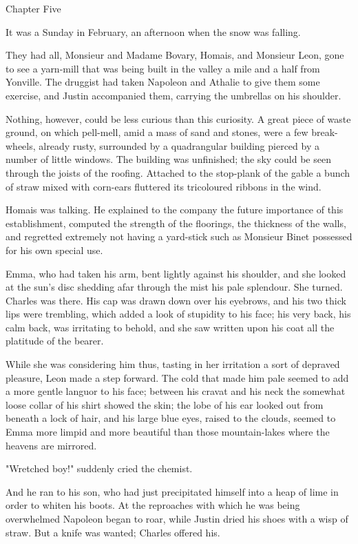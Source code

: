 \documentclass{tufte-book}
\begin{document}
Chapter Five

It was a Sunday in February, an afternoon when the snow was falling.

They had all, Monsieur and Madame Bovary, Homais, and Monsieur Leon,
gone to see a yarn-mill that was being built in the valley a mile and a
half from Yonville. The druggist had taken Napoleon and Athalie to give
them some exercise, and Justin accompanied them, carrying the umbrellas
on his shoulder.

Nothing, however, could be less curious than this curiosity. A great
piece of waste ground, on which pell-mell, amid a mass of sand and
stones, were a few break-wheels, already rusty, surrounded by a
quadrangular building pierced by a number of little windows. The
building was unfinished; the sky could be seen through the joists of the
roofing. Attached to the stop-plank of the gable a bunch of straw mixed
with corn-ears fluttered its tricoloured ribbons in the wind.

Homais was talking. He explained to the company the future importance
of this establishment, computed the strength of the floorings, the
thickness of the walls, and regretted extremely not having a yard-stick
such as Monsieur Binet possessed for his own special use.

Emma, who had taken his arm, bent lightly against his shoulder, and
she looked at the sun's disc shedding afar through the mist his pale
splendour. She turned. Charles was there. His cap was drawn down over
his eyebrows, and his two thick lips were trembling, which added a look
of stupidity to his face; his very back, his calm back, was irritating
to behold, and she saw written upon his coat all the platitude of the
bearer.

While she was considering him thus, tasting in her irritation a sort of
depraved pleasure, Leon made a step forward. The cold that made him pale
seemed to add a more gentle languor to his face; between his cravat and
his neck the somewhat loose collar of his shirt showed the skin; the
lobe of his ear looked out from beneath a lock of hair, and his large
blue eyes, raised to the clouds, seemed to Emma more limpid and more
beautiful than those mountain-lakes where the heavens are mirrored.

"Wretched boy!" suddenly cried the chemist.

And he ran to his son, who had just precipitated himself into a heap of
lime in order to whiten his boots. At the reproaches with which he was
being overwhelmed Napoleon began to roar, while Justin dried his shoes
with a wisp of straw. But a knife was wanted; Charles offered his.
\end{document}
